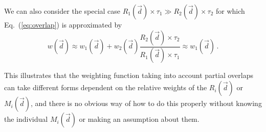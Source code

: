 \documentclass{article}[12pt,a4]
\begin{document}
We can also consider the special case $R_1(\vec{d}) \times \tau_1 \gg R_2(\vec{d}) \times \tau_2$ 
for which Eq.~(\ref{eq:overlap})
is approximated by
\begin{equation}
w(\vec{d}) \approx w_1(\vec{d}) + w_2(\vec{d}) \frac{R_2(\vec{d}) \times \tau_2}{R_1(\vec{d}) \times \tau_1}
\approx w_1(\vec{d}) \, .
\end{equation}

This illustrates that the weighting function taking into account partial overlaps can take different forms
dependent on the relative weights of the $R_i(\vec{d})$ or $M_i(\vec{d})$, and there is no obvious way
of how to do this properly without knowing the individual $M_i(\vec{d})$ or making an assumption about
them.
\end{document}
